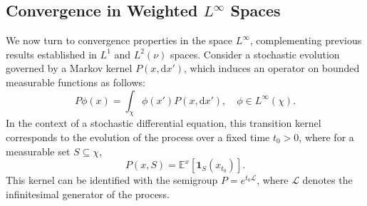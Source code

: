 \documentclass[11pt, twoside]{report}
\begin{document}

\subsection{Convergence in Weighted \texorpdfstring{$L^\infty$}{L-infinity} Spaces} \label{sec: linfty}

We now turn to convergence properties in the space $L^\infty$, complementing previous results established in $L^1$ and $L^2(\nu)$ spaces. Consider a stochastic evolution governed by a Markov kernel $P(x, \mathrm{d}x')$, which induces an operator on bounded measurable functions as follows:
\[
P\phi(x) = \int_\chi \phi(x')P(x, \mathrm{d}x'), \quad \phi \in L^\infty(\chi).
\]
In the context of a stochastic differential equation, this transition kernel corresponds to the evolution of the process over a fixed time $t_0 > 0$, where for a measurable set $S \subseteq \chi$,
\[
P(x, S) = \mathbb{E}^x\left[\mathbf{1}_S\left(x_{t_0}\right)\right].
\]
This kernel can be identified with the semigroup $P = e^{t_0 \mathcal{L}}$, where $\mathcal{L}$ denotes the infinitesimal generator of the process.
\end{document}
